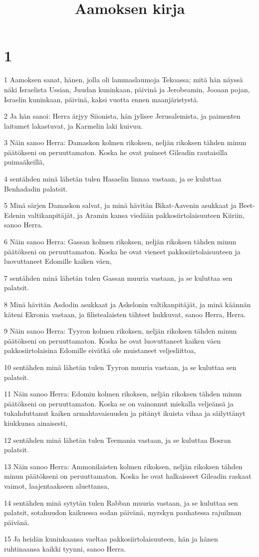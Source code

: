 

\title{Aamoksen kirja}


\chapter{1}

\par 1 Aamoksen sanat, hänen, jolla oli lammaslaumoja Tekoassa; mitä hän näyssä näki Israelista Ussian, Juudan kuninkaan, päivinä ja Jerobeamin, Jooaan pojan, Israelin kuninkaan, päivinä, kaksi vuotta ennen maanjäristystä.
\par 2 Ja hän sanoi: Herra ärjyy Siionista, hän jylisee Jerusalemista, ja paimenten laitumet lakastuvat, ja Karmelin laki kuivuu.
\par 3 Näin sanoo Herra: Damaskon kolmen rikoksen, neljän rikoksen tähden minun päätökseni on peruuttamaton. Koska he ovat puineet Gileadin rautaisilla puimaäkeillä,
\par 4 sentähden minä lähetän tulen Hasaelin linnaa vastaan, ja se kuluttaa Benhadadin palatsit.
\par 5 Minä särjen Damaskon salvat, ja minä hävitän Bikat-Aavenin asukkaat ja Beet-Edenin valtikanpitäjät, ja Aramin kansa viedään pakkosiirtolaisuuteen Kiiriin, sanoo Herra.
\par 6 Näin sanoo Herra: Gassan kolmen rikoksen, neljän rikoksen tähden minun päätökseni on peruuttamaton. Koska he ovat vieneet pakkosiirtolaisuuteen ja luovuttaneet Edomille kaiken väen,
\par 7 sentähden minä lähetän tulen Gassan muuria vastaan, ja se kuluttaa sen palatsit.
\par 8 Minä hävitän Asdodin asukkaat ja Askelonin valtikanpitäjät, ja minä käännän käteni Ekronia vastaan, ja filistealaisten tähteet hukkuvat, sanoo Herra, Herra.
\par 9 Näin sanoo Herra: Tyyron kolmen rikoksen, neljän rikoksen tähden minun päätökseni on peruuttamaton. Koska he ovat luovuttaneet kaiken väen pakkosiirtolaisina Edomille eivätkä ole muistaneet veljesliittoa,
\par 10 sentähden minä lähetän tulen Tyyron muuria vastaan, ja se kuluttaa sen palatsit.
\par 11 Näin sanoo Herra: Edomin kolmen rikoksen, neljän rikoksen tähden minun päätökseni on peruuttamaton. Koska se on vainonnut miekalla veljeänsä ja tukahduttanut kaiken armahtavaisuuden ja pitänyt ikuista vihaa ja säilyttänyt kiukkunsa ainaisesti,
\par 12 sentähden minä lähetän tulen Teemania vastaan, ja se kuluttaa Bosran palatsit.
\par 13 Näin sanoo Herra: Ammonilaisten kolmen rikoksen, neljän rikoksen tähden minun päätökseni on peruuttamaton. Koska he ovat halkaisseet Gileadin raskaat vaimot, laajentaakseen aluettansa,
\par 14 sentähden minä sytytän tulen Rabban muuria vastaan, ja se kuluttaa sen palatsit, sotahuudon kaikuessa sodan päivänä, myrskyn pauhatessa rajuilman päivänä.
\par 15 Ja heidän kuninkaansa vaeltaa pakkosiirtolaisuuteen, hän ja hänen ruhtinaansa kaikki tyynni, sanoo Herra.


